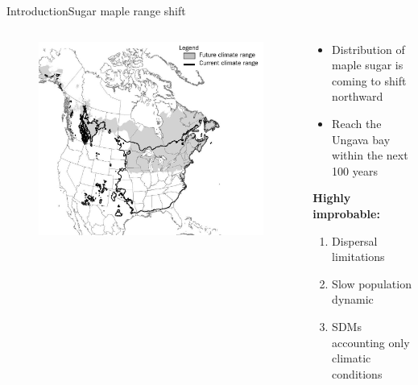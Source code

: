 \documentclass[table]{eecslides}
\begin{document}
\begin{frame}{Introduction}{Sugar maple range shift}

\begin{columns}[c]
	\begin{column}{.4\paperwidth}
		\begin{figure}
			\includegraphics[width=.45\paperwidth]{Figs/sugar_map_distrib.jpg}
			\caption*{\scriptsize{\cite{Sciences2014}}}
		\end{figure}
	\end{column}
	\begin{column}{.5\paperwidth}
		 \begin{itemize}
		  \item Distribution of maple sugar is coming to shift northward
		  \item Reach the Ungava bay within the next 100 years
		 \end{itemize}
		  \pause
		  \vspace{1em}
		  \textbf{Highly improbable: }
		  \begin{enumerate}
		  	\item Dispersal limitations
		  	\item Slow population dynamic
		  	\item SDMs accounting only climatic conditions
		  \end{enumerate}

	\end{column}
\end{columns}

\end{frame}
\end{document}

